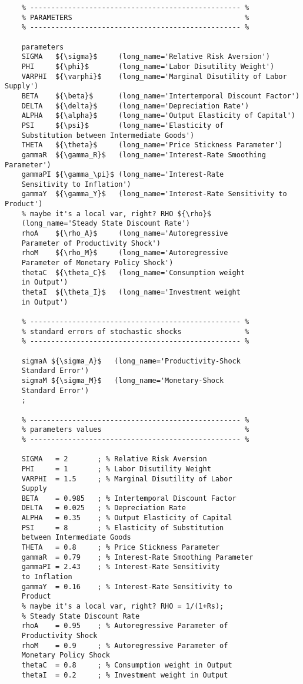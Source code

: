 \documentclass[
thesis.tex
]{subfiles}
\begin{document}
{\begin{verbatim}
	% -------------------------------------------------- %
	% PARAMETERS                                         %
	% -------------------------------------------------- %
	
	parameters
	SIGMA   ${\sigma}$     (long_name='Relative Risk Aversion')
	PHI     ${\phi}$       (long_name='Labor Disutility Weight')  
	VARPHI  ${\varphi}$    (long_name='Marginal Disutility of Labor Supply')
	BETA    ${\beta}$      (long_name='Intertemporal Discount Factor')
	DELTA   ${\delta}$     (long_name='Depreciation Rate')
	ALPHA   ${\alpha}$     (long_name='Output Elasticity of Capital')
	PSI     ${\psi}$       (long_name='Elasticity of 
	Substitution between Intermediate Goods')
	THETA   ${\theta}$     (long_name='Price Stickness Parameter')
	gammaR  ${\gamma_R}$   (long_name='Interest-Rate Smoothing Parameter')
	gammaPI ${\gamma_\pi}$ (long_name='Interest-Rate 
	Sensitivity to Inflation')
	gammaY  ${\gamma_Y}$   (long_name='Interest-Rate Sensitivity to Product')
	% maybe it's a local var, right? RHO ${\rho}$ 
	(long_name='Steady State Discount Rate')
	rhoA    ${\rho_A}$     (long_name='Autoregressive 
	Parameter of Productivity Shock')
	rhoM    ${\rho_M}$     (long_name='Autoregressive 
	Parameter of Monetary Policy Shock')
	thetaC  ${\theta_C}$   (long_name='Consumption weight 
	in Output')
	thetaI  ${\theta_I}$   (long_name='Investment weight 
	in Output')
	
	% -------------------------------------------------- % 
	% standard errors of stochastic shocks               %
	% -------------------------------------------------- %
	
	sigmaA ${\sigma_A}$   (long_name='Productivity-Shock 
	Standard Error')
	sigmaM ${\sigma_M}$   (long_name='Monetary-Shock 
	Standard Error')
	;
	
	% -------------------------------------------------- %
	% parameters values                                  %
	% -------------------------------------------------- % 
	
	SIGMA   = 2       ; % Relative Risk Aversion
	PHI     = 1       ; % Labor Disutility Weight
	VARPHI  = 1.5     ; % Marginal Disutility of Labor 
	Supply
	BETA    = 0.985   ; % Intertemporal Discount Factor
	DELTA   = 0.025   ; % Depreciation Rate
	ALPHA   = 0.35    ; % Output Elasticity of Capital
	PSI     = 8       ; % Elasticity of Substitution 
	between Intermediate Goods
	THETA   = 0.8     ; % Price Stickness Parameter
	gammaR  = 0.79    ; % Interest-Rate Smoothing Parameter
	gammaPI = 2.43    ; % Interest-Rate Sensitivity 
	to Inflation
	gammaY  = 0.16    ; % Interest-Rate Sensitivity to 
	Product
	% maybe it's a local var, right? RHO = 1/(1+Rs); 
	% Steady State Discount Rate
	rhoA    = 0.95    ; % Autoregressive Parameter of 
	Productivity Shock
	rhoM    = 0.9     ; % Autoregressive Parameter of 
	Monetary Policy Shock
	thetaC  = 0.8     ; % Consumption weight in Output
	thetaI  = 0.2     ; % Investment weight in Output
	

\end{verbatim}}
\end{document}
